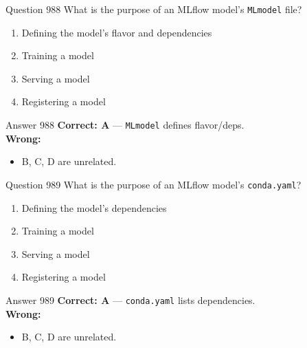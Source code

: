 \documentclass[aspectratio=169,11pt]{beamer}
\begin{document}
	\begin{frame}{Question 988}
		What is the purpose of an MLflow model's \texttt{MLmodel} file?
		\begin{enumerate}[label=\Alph*.]
			\item Defining the model's flavor and dependencies
			\item Training a model
			\item Serving a model
			\item Registering a model
		\end{enumerate}
	\end{frame}
	\begin{frame}{Answer 988}
		\textbf{Correct: A} --- \texttt{MLmodel} defines flavor/deps.\\
		\vspace{0.5em}
		\textbf{Wrong:}
		\begin{itemize}
			\item B, C, D are unrelated.
		\end{itemize}
	\end{frame}
	
	\begin{frame}{Question 989}
		What is the purpose of an MLflow model's \texttt{conda.yaml}?
		\begin{enumerate}[label=\Alph*.]
			\item Defining the model's dependencies
			\item Training a model
			\item Serving a model
			\item Registering a model
		\end{enumerate}
	\end{frame}
	\begin{frame}{Answer 989}
		\textbf{Correct: A} --- \texttt{conda.yaml} lists dependencies.\\
		\vspace{0.5em}
		\textbf{Wrong:}
		\begin{itemize}
			\item B, C, D are unrelated.
		\end{itemize}
	\end{frame}
	
\end{document}
